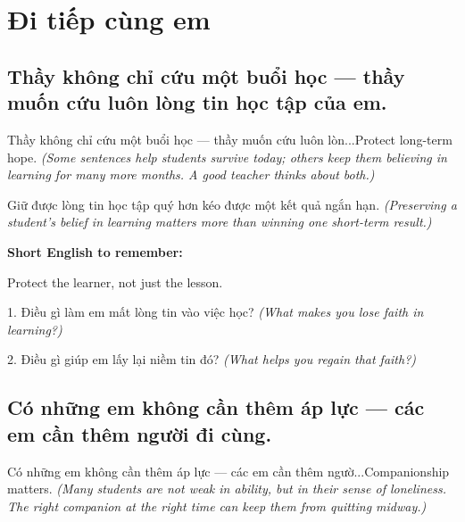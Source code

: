 \chapter{Đi tiếp cùng em}


\section{Thầy không chỉ cứu một buổi học — thầy muốn cứu luôn lòng tin học tập của em.}
\begin{truyen}{Thầy không chỉ cứu một buổi học — thầy muốn cứu luôn lòn...}{Protect long-term hope.}
\textit{(Some sentences help students survive today; others keep them believing in learning for many more months. A good teacher thinks about both.)}
\end{truyen}

\begin{baihoc}
Giữ được lòng tin học tập quý hơn kéo được một kết quả ngắn hạn.
\textit{(Preserving a student's belief in learning matters more than winning one short-term result.)}
\end{baihoc}

\begin{ghinhoanh}
\textbf{Short English to remember:}

Protect the learner, not just the lesson.

\end{ghinhoanh}

\begin{tuhocnhanh}
1. Điều gì làm em mất lòng tin vào việc học? \textit{(What makes you lose faith in learning?)}

2. Điều gì giúp em lấy lại niềm tin đó? \textit{(What helps you regain that faith?)}
\end{tuhocnhanh}
\ngancach


\section{Có những em không cần thêm áp lực — các em cần thêm người đi cùng.}
\begin{truyen}{Có những em không cần thêm áp lực — các em cần thêm ngườ...}{Companionship matters.}
\textit{(Many students are not weak in ability, but in their sense of loneliness. The right companion at the right time can keep them from quitting midway.)}
\end{truyen}

